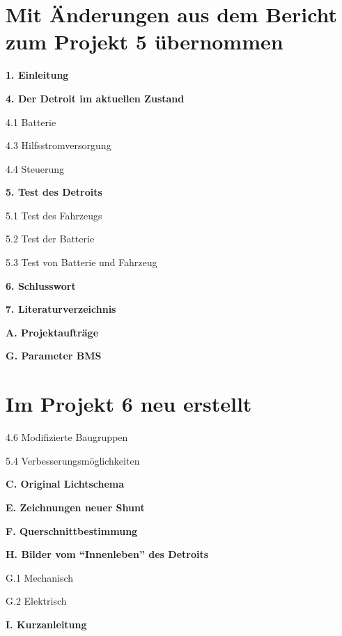 \section*{Mit Änderungen aus dem Bericht zum Projekt 5 übernommen}
\begin{compactitem}
\item \textbf{1. Einleitung}
\item \textbf{4. Der Detroit im aktuellen Zustand}
\item 4.1 Batterie
\item 4.3 Hilfsstromversorgung
\item 4.4 Steuerung
\item \textbf{5. Test des Detroits}
\item 5.1 Test des Fahrzeugs
\item 5.2 Test der Batterie
\item 5.3 Test von Batterie und Fahrzeug
\item \textbf{6. Schlusswort}
\item \textbf{7. Literaturverzeichnis}
\item \textbf{A. Projektaufträge}
\item \textbf{G. Parameter BMS}
\end{compactitem}

\section*{Im Projekt 6 neu erstellt}
\begin{compactitem}
\item 4.6 Modifizierte Baugruppen
\item 5.4 Verbesserungsmöglichkeiten
\item \textbf{C. Original Lichtschema}
\item \textbf{E. Zeichnungen neuer Shunt}
\item \textbf{F. Querschnittbestimmung}
\item \textbf{H. Bilder vom "`Innenleben"' des Detroits}
\item G.1 Mechanisch
\item G.2 Elektrisch
\item \textbf{I. Kurzanleitung}
\end{compactitem}